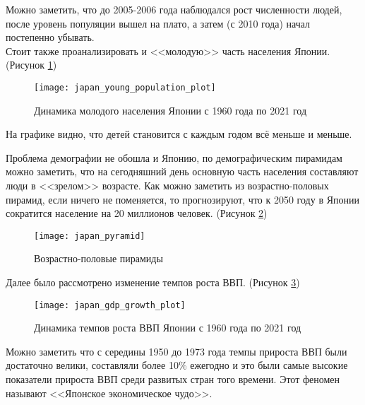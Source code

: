 Можно заметить, что до 2005-2006 года наблюдался рост численности людей, после уровень популяции вышел на плато, а затем (с 2010 года) начал постепенно убывать.\\

Стоит также проанализировать и <<молодую>> часть населения Японии. (Рисунок \ref{fig:japan_young_population_plot})

\begin{figure}[h]
	\centering \texttt{[image: japan\_young\_population\_plot]}
	\caption{Динамика молодого населения Японии с 1960 года по 2021 год}
	\label{fig:japan_young_population_plot}
\end{figure}

На графике видно, что детей становится с каждым годом всё меньше и меньше.

\newpage

Проблема демографии не обошла и Японию, по демографическим пирамидам можно заметить, что на сегодняшний день основную часть населения составляют люди в <<зрелом>> возрасте. Как можно заметить из возрастно-половых пирамид, если ничего не поменяется, то прогнозируют, что к 2050 году в Японии сократится население на 20 миллионов человек. (Рисунок \ref{fig:japan_pyramid})

\begin{figure}[h]
	\centering \texttt{[image: japan\_pyramid]}
	\caption{Возрастно-половые пирамиды}
	\label{fig:japan_pyramid}
\end{figure}

Далее было рассмотрено изменение темпов роста ВВП. (Рисунок \ref{fig:japan_gdp_growth_plot})

\begin{figure}[h]
	\centering \texttt{[image: japan\_gdp\_growth\_plot]}
	\caption{Динамика темпов роста ВВП Японии с 1960 года по 2021 год}
	\label{fig:japan_gdp_growth_plot}
\end{figure}

Можно заметить что с середины 1950 до 1973 года темпы прироста ВВП были достаточно велики, составляли более 10\% ежегодно и это были самые высокие показатели прироста ВВП среди развитых стран того времени. Этот феномен называют <<Японское экономическое чудо>>.

\newpage

